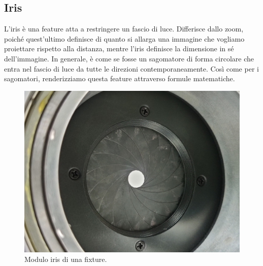 \documentclass[main.tex]{subfiles}
\begin{document}
\clearpage
\subsection{Iris}\label{subsec:5_Iris}
L'iris è una feature atta a restringere un fascio di luce. Differisce dallo zoom, poiché quest'ultimo definisce di quanto si allarga una immagine che vogliamo proiettare rispetto alla distanza, mentre l'iris definisce la dimensione in sé dell'immagine. In generale, è come se fosse un sagomatore di forma circolare che entra nel fascio di luce da tutte le direzioni contemporaneamente. Così come per i sagomatori, renderizziamo questa feature attraverso formule matematiche.
\begin{figure}[H]
    \centering
    \includegraphics[width=.75\linewidth]{img/newFeatures/Iris.jpg}
    \caption{Modulo iris di una fixture.}
    \label{fig:5_iris}
\end{figure}
\end{document}

